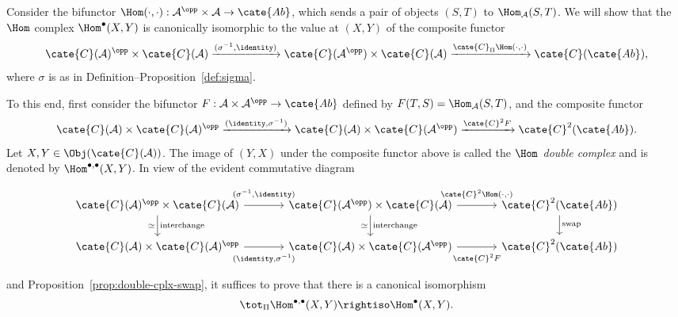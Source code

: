 \begin{example}\label{eg:Hom-bicplx}
	Consider the bifunctor
	$\Hom(\cdot,\cdot):\mathcal{A}^{\opp}\times\mathcal{A}\to\cate{Ab}$,
	which sends a pair of objects $(S,T)$ to $\Hom_{\mathcal{A}}(S,T)$. We
	will show that the $\Hom$ complex $\Hom^\bullet(X,Y)$ is canonically
	isomorphic to the value at $(X,Y)$ of the composite functor
	\[ \cate{C}(\mathcal{A})^{\opp} \times \cate{C}(\mathcal{A}) \xrightarrow{(\sigma^{-1}, \identity)} \cate{C}(\mathcal{A}^{\opp}) \times \cate{C}(\mathcal{A}) \xrightarrow{\cate{C}_{\Pi} \Hom(\cdot, \cdot)} \cate{C}(\cate{Ab}), \]
	where $\sigma$ is as in Definition--Proposition~\ref{def:sigma}.

	To this end, first consider the bifunctor
	$F:\mathcal{A}\times\mathcal{A}^{\opp}\to\cate{Ab}$ defined by
	$F(T,S)=\Hom_{\mathcal{A}}(S,T)$, and the composite functor
	\[ \cate{C}(\mathcal{A}) \times \cate{C}(\mathcal{A})^{\opp} \xrightarrow{(\identity, \sigma^{-1})} \cate{C}(\mathcal{A}) \times \cate{C}(\mathcal{A}^{\opp}) \xrightarrow{\cate{C}^2 F} \cate{C}^2(\cate{Ab}). \]
	Let $X,Y\in\Obj(\cate{C}(\mathcal{A}))$. The image of $(Y,X)$ under
	the composite functor above is called the \emph{$\Hom$ double complex}
	and is denoted by $\Hom^{\bullet,\bullet}(X,Y)$. In view of the evident
	commutative diagram
	\[\begin{tikzcd}[column sep=large]
		\cate{C}(\mathcal{A})^{\opp} \times \cate{C}(\mathcal{A}) \arrow[d, "\simeq"', "\text{interchange}"] \arrow[r, "{(\sigma^{-1}, \identity)}" inner sep=0.6em] & \cate{C}(\mathcal{A}^{\opp}) \times \cate{C}(\mathcal{A}) \arrow[r, "{\cate{C}^2 \Hom(\cdot, \cdot)}" inner sep=0.6em] \arrow[d, "\simeq"', "\text{interchange}"] & \cate{C}^2(\cate{Ab}) \arrow[d, "\mathrm{swap}"] \\
		\cate{C}(\mathcal{A}) \times \cate{C}(\mathcal{A})^{\opp} \arrow[r, "{(\identity, \sigma^{-1})}"' inner sep=0.6em] & \cate{C}(\mathcal{A}) \times \cate{C}(\mathcal{A}^{\opp}) \arrow[r, "{\cate{C}^2 F}"' inner sep=0.6em] & \cate{C}^2(\cate{Ab})
	\end{tikzcd}\]
	and Proposition~\ref{prop:double-cplx-swap}, it suffices to prove that
	there is a canonical isomorphism
	\[
		\tot_{\Pi}\Hom^{\bullet,\bullet}(X,Y)
		\rightiso \Hom^\bullet(X,Y).
	\]


\end{example}
